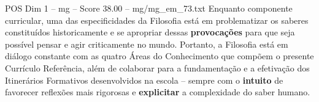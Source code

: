 \begin{textsample}{POS Dim 1 – mg – Score 38.00 – mg/mg\_em\_73.txt}
Enquanto componente curricular, uma das especificidades da Filosofia está em problematizar os saberes constituídos historicamente e se apropriar dessas \textbf{provocações} para que seja possível pensar e agir criticamente no mundo.
Portanto, a Filosofia está em diálogo constante com as quatro Áreas do Conhecimento que compõem o presente Currículo Referência, além de colaborar para a fundamentação e a efetivação dos Itinerários Formativos desenvolvidos na escola – sempre com o \textbf{intuito} de favorecer reflexões mais rigorosas e \textbf{explicitar} a complexidade do saber humano.

\end{textsample}
